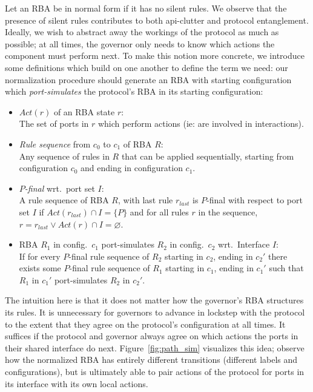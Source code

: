 Let an RBA be in normal form if it has no silent rules. We observe that the presence of silent rules contributes to both api-clutter and protocol entanglement. Ideally, we wish to abstract away the workings of the protocol as much as possible; at all times, the governor only needs to know which actions the component must perform next. To make this notion more concrete, we introduce some definitions which build on one another to define the term we need: our normalization procedure should generate an RBA with starting configuration which \textit{port-simulates} the protocol's RBA in its starting configuration:
\begin{itemize}
	\item $Act(r)$ of an RBA state $r$:\\
	The set of ports in $r$ which perform actions (ie: are involved in interactions).
	
	\item \textit{Rule sequence} from $c_0$ to $c_1$ of RBA $R$:\\
	Any sequence of rules in $R$ that can be applied sequentially, starting from configuration $c_0$ and ending in configuration $c_1$.
	
	\item \textit{$P$-final} wrt.\ port set $I$:\\
	A rule sequence of RBA $R$, with last rule $r_{last}$ is $P$-final with respect to port set $I$ if $Act(r_{last})\cap{}I=\{P\}$ and for all rules $r$ in the sequence, $r=r_{last} \lor{} Act(r)\cap{}I=\varnothing$.	
	
	\item RBA $R_1$ in config.\ $c_1$ port-simulates $R_2$ in config.\ $c_2$ wrt.\ Interface $I$:\\
	If for every $P$-final rule sequence of $R_2$ starting in $c_2$, ending in $c_2'$ there exists some $P$-final rule sequence of $R_1$ starting in $c_1$, ending in $c_1'$ such that $R_1$ in $c_1'$ port-simulates $R_2$ in $c_2'$.
\end{itemize}

The intuition here is that it does not matter how the governor's RBA structures its rules. It is unnecessary for governors to advance in lockstep with the protocol to the extent that they agree on the protocol's configuration at all times. It suffices if the protocol and governor always agree on which actions the ports in their shared interface do next. Figure~\ref{fig:path_sim} visualizes this idea; observe how the normalized RBA has entirely different transitions (different labels and configurations), but is ultimately able to pair actions of the protocol for ports in its interface with its own local actions.

